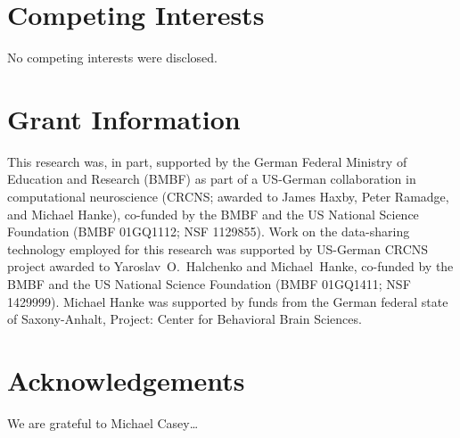 
\section*{Competing Interests}
No competing interests were disclosed.

\section*{Grant Information}

This research was, in part, supported by the German Federal Ministry of
Education and Research (BMBF) as part of a US-German collaboration in
computational neuroscience (CRCNS; awarded to James Haxby, Peter Ramadge, and
Michael Hanke), co-funded by the BMBF and the US National Science Foundation
(BMBF 01GQ1112; NSF 1129855).  Work on the data-sharing technology employed for
this research was supported by US-German CRCNS project awarded to
Yaroslav~O.~Halchenko and Michael~Hanke, co-funded by the BMBF and the US
National Science Foundation (BMBF 01GQ1411; NSF 1429999).  Michael Hanke was
supported by funds from the German federal state of Saxony-Anhalt, Project:
Center for Behavioral Brain Sciences.


\section*{Acknowledgements}

We are grateful to Michael Casey\ldots





